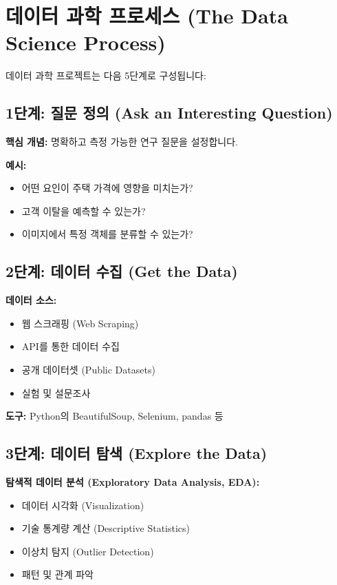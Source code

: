 \documentclass[12pt,a4paper]{article}
\begin{document}
\section{데이터 과학 프로세스 (The Data Science Process)}

데이터 과학 프로젝트는 다음 5단계로 구성됩니다:

\subsection{1단계: 질문 정의 (Ask an Interesting Question)}

\textbf{핵심 개념:} 명확하고 측정 가능한 연구 질문을 설정합니다.

\textbf{예시:}
\begin{itemize}
    \item 어떤 요인이 주택 가격에 영향을 미치는가?
    \item 고객 이탈을 예측할 수 있는가?
    \item 이미지에서 특정 객체를 분류할 수 있는가?
\end{itemize}

\subsection{2단계: 데이터 수집 (Get the Data)}

\textbf{데이터 소스:}
\begin{itemize}
    \item 웹 스크래핑 (Web Scraping)
    \item API를 통한 데이터 수집
    \item 공개 데이터셋 (Public Datasets)
    \item 실험 및 설문조사
\end{itemize}

\textbf{도구:} Python의 BeautifulSoup, Selenium, pandas 등

\subsection{3단계: 데이터 탐색 (Explore the Data)}

\textbf{탐색적 데이터 분석 (Exploratory Data Analysis, EDA):}
\begin{itemize}
    \item 데이터 시각화 (Visualization)
    \item 기술 통계량 계산 (Descriptive Statistics)
    \item 이상치 탐지 (Outlier Detection)
    \item 패턴 및 관계 파악
\end{itemize}
\end{document}

